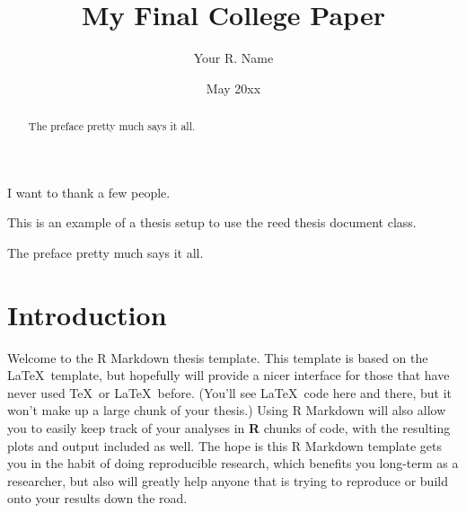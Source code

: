 \documentclass[12pt,twoside]{reedthesis}
\title{My Final College Paper}
\author{Your R. Name}
\date{May 20xx}
\begin{document}
      \maketitle
  
  \frontmatter %
  \pagestyle{empty} %

      \begin{acknowledgements}
      I want to thank a few people.
    \end{acknowledgements}
  
      \begin{preface}
      This is an example of a thesis setup to use the reed thesis document
      class.
    \end{preface}
  

    {
    \hypersetup{linkcolor=black}
    \setcounter{tocdepth}{2}
    \tableofcontents
  }
  
      \listoftables
  
      \listoffigures
  
      \begin{abstract}
      The preface pretty much says it all.
    \end{abstract}
  
      \begin{dedication}
      The preface pretty much says it all.
    \end{dedication}
  
%  
  \mainmatter %
  \pagestyle{fancyplain} %

  \chapter*{Introduction}
  
  
   
  
  Welcome to the R Markdown thesis template. This template is based on the
  \LaTeX~template, but hopefully will provide a nicer interface for those
  that have never used \TeX~or \LaTeX~before. (You'll see \LaTeX~code here
  and there, but it won't make up a large chunk of your thesis.) Using R
  Markdown will also allow you to easily keep track of your analyses in
  \textbf{R} chunks of code, with the resulting plots and output included
  as well. The hope is this R Markdown template gets you in the habit of
  doing reproducible research, which benefits you long-term as a
  researcher, but also will greatly help anyone that is trying to
  reproduce or build onto your results down the road.
  
\end{document}
